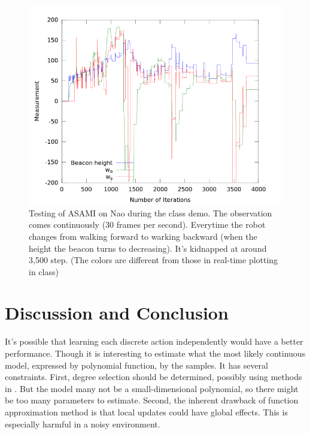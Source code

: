 \documentclass[10pt]{IEEEtran}
\begin{document}
\begin{figure}
\centering
\includegraphics[width=\columnwidth]{demoResult.png}
\caption{Testing of ASAMI on Nao during the class demo. The
observation comes continuously (30 frames per second). Everytime the
robot changes from walking forward to warking backward (when the
height the beacon turns to decreasing). It's kidnapped at around 3,500
step.  (The colors are different from those in real-time plotting in
class)}

\label{fig:fuelworld}
\end{figure}


\section{Discussion and Conclusion}
\label{sec:dis}

It's possible that learning each discrete action independently would
have a better performance. Though it is interesting to estimate what
the most likely continuous model, expressed by polynomial function, by
the samples. It has several constraints. First, degree selection
should be determined, possibly using methods in
\cite{IJAIT08-stronger}. But the model many not be a small-dimensional
polynomial, so there might be too many parameters to estimate. Second,
the inherent drawback of function approximation method is that local
updates could have global effects. This is especially harmful in a
noisy environment.




\end{document}
